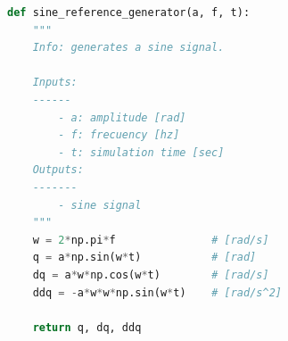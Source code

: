 \begin{lstlisting}[language=Python,caption=Function to generate sinusoidal reference., label={lst:sine_reference_generator}]
def sine_reference_generator(a, f, t):
    """
    Info: generates a sine signal.

    Inputs: 
    ------
        - a: amplitude [rad]
        - f: frecuency [hz]
        - t: simulation time [sec]
    Outputs:
    -------
        - sine signal
    """
    w = 2*np.pi*f               # [rad/s]
    q = a*np.sin(w*t)           # [rad]
    dq = a*w*np.cos(w*t)        # [rad/s]
    ddq = -a*w*w*np.sin(w*t)    # [rad/s^2]

    return q, dq, ddq
\end{lstlisting}
